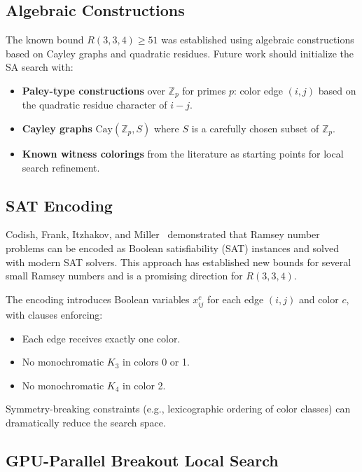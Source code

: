 \documentclass[11pt,a4paper]{article}
\theoremstyle{definition}
\theoremstyle{remark}
\newcommand{\Z}{\mathbb{Z}}
\begin{document}
\subsection{Algebraic Constructions}\label{sec:algebraic}

The known bound $R(3,3,4) \ge 51$ was established using algebraic
constructions based on Cayley graphs and quadratic residues.
Future work should initialize the SA search with:

\begin{itemize}
  \item \textbf{Paley-type constructions} over $\Z_p$ for primes $p$:
        color edge $(i,j)$ based on the quadratic residue character of
        $i - j$.
  \item \textbf{Cayley graphs} $\text{Cay}(\Z_p, S)$ where $S$ is a
        carefully chosen subset of $\Z_p$.
  \item \textbf{Known witness colorings} from the literature as starting
        points for local search refinement.
\end{itemize}

\subsection{SAT Encoding}\label{sec:sat}

Codish, Frank, Itzhakov, and Miller~\cite{Codish2016} demonstrated that
Ramsey number problems can be encoded as Boolean satisfiability (SAT)
instances and solved with modern SAT solvers.  This approach has
established new bounds for several small Ramsey numbers and is a
promising direction for $R(3,3,4)$.

The encoding introduces Boolean variables $x_{ij}^c$ for each edge
$(i,j)$ and color $c$, with clauses enforcing:
\begin{itemize}
  \item Each edge receives exactly one color.
  \item No monochromatic $K_3$ in colors 0 or 1.
  \item No monochromatic $K_4$ in color 2.
\end{itemize}

Symmetry-breaking constraints (e.g., lexicographic ordering of color
classes) can dramatically reduce the search space.

\subsection{GPU-Parallel Breakout Local Search}\label{sec:gpu}
\end{document}
